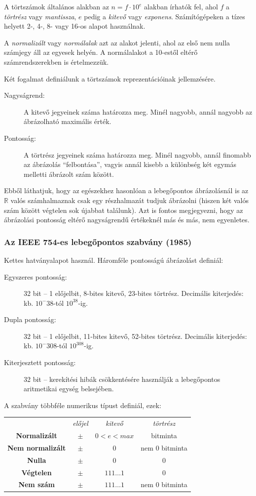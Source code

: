 \documentclass[10pt]{article}
\begin{document}
A törtszámok általános alakban az $n=f \cdot 10^e$ alakban írhatók fel, ahol $f$ a \emph{törtrész} vagy \emph{mantissza}, $e$ pedig a \emph{kitevő} vagy \emph{exponens}. Számítógépeken a tízes helyett 2-, 4-, 8- vagy 16-os alapot használnak.

A \emph{normalizált} vagy \emph{normálalak} azt az alakot jelenti, ahol az első nem nulla számjegy áll az egyesek helyén. A normálalakot a 10-estől eltérő számrendszerekben is értelmezzük.

Két fogalmat definiálunk a törtszámok reprezentációinak jellemzésére.
\begin{description}
	\item[Nagyságrend:] A kitevő jegyeinek száma határozza meg. Minél nagyobb, annál nagyobb az ábrázolható maximális érték.
	\item[Pontosság:] A törtrész jegyeinek száma határozza meg. Minél nagyobb, annál finomabb az ábrázolás ``felbontása'', vagyis annál kisebb a különbség két egymás melletti ábrázolt szám között.
\end{description}
Ebből láthatjuk, hogy az egészekhez hasonlóan a lebegőpontos ábrázolásnál is az $\mathbb{R}$ valós számhalmaznak csak egy részhalmazát tudjuk ábrázolni (hiszen két valós szám között végtelen sok újabbat találunk). Azt is fontos megjegyezni, hogy az ábrázolási pontosság eltérő nagyságrendű értékeknél más és más, nem egyenletes.

\subsubsection{Az IEEE 754-es lebegőpontos szabvány (1985)}

Kettes hatványalapot használ. Háromféle pontosságú ábrázolást definiál:
\begin{description}
	\item[Egyszeres pontosság:] 32 bit -- 1 előjelbit, 8-bites kitevő, 23-bites törtrész. Decimális kiterjedés: kb. $10^-38$-tól $10^38$-ig.
	\item[Dupla pontosság:] 32 bit -- 1 előjelbit, 11-bites kitevő, 52-bites törtrész. Decimális kiterjedés: kb. $10^-308$-tól $10^308$-ig.
	\item[Kiterjesztett pontosság:] 32 bit -- kerekítési hibák csökkentésére használják a lebegőpontos aritmetikai egység belsejében.
\end{description}

A szabvány többféle numerikus típust definiál, ezek:

\vspace{3mm}
\begin{tabular}{c c c c}
	& \emph{előjel} & \emph{kitevő} & \emph{törtrész}\\
	\textbf{Normalizált} & $\pm$ & $0<e<max$ & bitminta\\
	\textbf{Nem normalizált} & $\pm$ & 0 & nem 0 bitminta\\
	\textbf{Nulla} & $\pm$ & 0 & 0\\
	\textbf{Végtelen} & $\pm$ & $111\dots1$ & 0\\
	\textbf{Nem szám} & $\pm$ & $111\dots1$ & nem 0 bitminta\\
\end{tabular}
\vspace{3mm}
\end{document}
